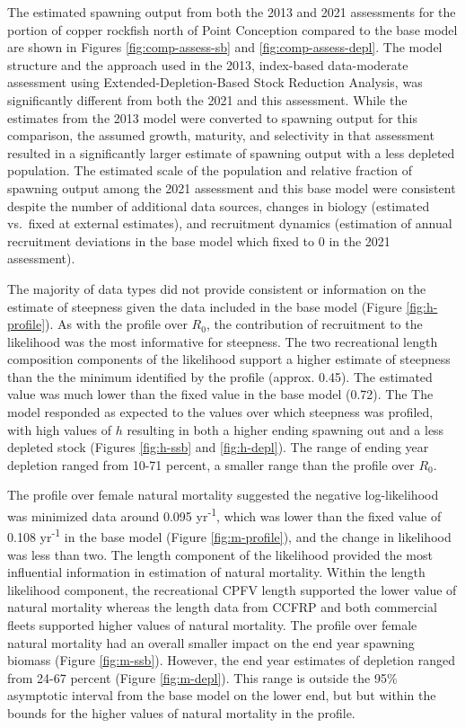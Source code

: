 \documentclass[11pt,
  letterpaper,
]{article}
\begin{document}
The estimated spawning output from both the 2013 and 2021 assessments for the portion of copper rockfish north of Point Conception compared to the base model are shown in Figures \ref{fig:comp-assess-sb} and \ref{fig:comp-assess-depl}. The model structure and the approach used in the 2013, index-based data-moderate assessment using Extended-Depletion-Based Stock Reduction Analysis, was significantly different from both the 2021 and this assessment. While the estimates from the 2013 model were converted to spawning output for this comparison, the assumed growth, maturity, and selectivity in that assessment resulted in a significantly larger estimate of spawning output with a less depleted population. The estimated scale of the population and relative fraction of spawning output among the 2021 assessment and this base model were consistent despite the number of additional data sources, changes in biology (estimated vs.~fixed at external estimates), and recruitment dynamics (estimation of annual recruitment deviations in the base model which fixed to 0 in the 2021 assessment).

The majority of data types did not provide consistent or information on the estimate of steepness given the data included in the base model (Figure \ref{fig:h-profile}). As with the profile over \(R_0\), the contribution of recruitment to the likelihood was the most informative for steepness. The two recreational length composition components of the likelihood support a higher estimate of steepness than the the minimum identified by the profile (approx. 0.45). The estimated value was much lower than the fixed value in the base model (0.72). The The model responded as expected to the values over which steepness was profiled, with high values of \(h\) resulting in both a higher ending spawning out and a less depleted stock (Figures \ref{fig:h-ssb} and \ref{fig:h-depl}). The range of ending year depletion ranged from 10-71 percent, a smaller range than the profile over \(R_0\).

The profile over female natural mortality suggested the negative log-likelihood was minimized data around 0.095 yr\textsuperscript{-1}, which was lower than the fixed value of 0.108 yr\textsuperscript{-1} in the base model (Figure \ref{fig:m-profile}), and the change in likelihood was less than two. The length component of the likelihood provided the most influential information in estimation of natural mortality. Within the length likelihood component, the recreational CPFV length supported the lower value of natural mortality whereas the length data from CCFRP and both commercial fleets supported higher values of natural mortality. The profile over female natural mortality had an overall smaller impact on the end year spawning biomass (Figure \ref{fig:m-ssb}). However, the end year estimates of depletion ranged from 24-67 percent (Figure \ref{fig:m-depl}). This range is outside the 95\% asymptotic interval from the base model on the lower end, but but within the bounds for the higher values of natural mortality in the profile.
\end{document}
